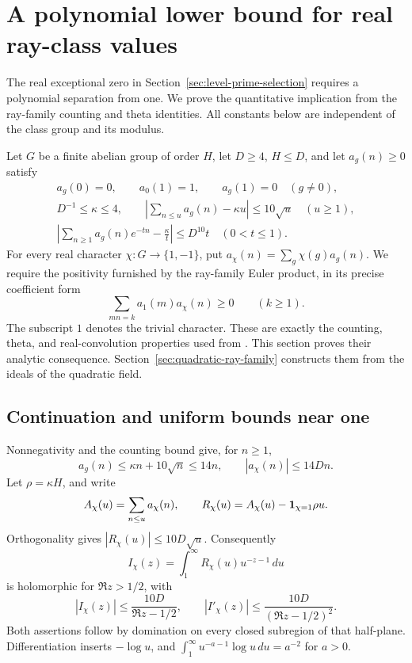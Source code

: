 \section{A polynomial lower bound for real ray-class values}
\label{sec:ray-real-gap}

The real exceptional zero in
Section~\ref{sec:level-prime-selection} requires a polynomial separation
from one. We prove the quantitative implication from the ray-family
counting and theta identities. All constants below are independent of
the class group and its modulus.

Let \(G\) be a finite abelian group of order \(H\), let \(D\geq4\),
\(H\leq D\), and let \(a_g(n)\geq0\) satisfy
\[
 \begin{gathered}
 a_g(0)=0,\qquad a_0(1)=1,\qquad a_g(1)=0\quad(g\ne0),\\
 D^{-1}\leq\kappa\leq4,\qquad
 \left|\sum_{n\leq u}a_g(n)-\kappa u\right|
                                  \leq10\sqrt u\quad(u\geq1),\\
 \left|\sum_{n\geq1}a_g(n)e^{-tn}-\frac{\kappa}{t}\right|
                                   \leq D^{10}t\quad(0<t\leq1).
 \end{gathered}
\]
For every real character \(\chi:G\to\{1,-1\}\), put
\(a_\chi(n)=\sum_g\chi(g)a_g(n)\).
We require the positivity furnished by the ray-family Euler product,
in its precise coefficient form
\begin{equation}
 \label{eq:ray-convolution-positive}
          \sum_{mn=k}a_1(m)a_\chi(n)\geq0\qquad(k\geq1).
\end{equation}
The subscript \(1\) denotes the trivial character. These are exactly
the counting, theta, and real-convolution properties used from
. This section proves their analytic consequence. Section~\ref{sec:quadratic-ray-family} constructs them from the ideals
of the quadratic field.

\subsection{Continuation and uniform bounds near one}

Nonnegativity and the counting bound give, for \(n\geq1\),
\[
       a_g(n)\leq\kappa n+10\sqrt n\leq14n,
                         \qquad |a_\chi(n)|\leq14Dn.
\]
Let \(\rho=\kappa H\), and write
\[
 A_\chi(u)=\sum_{n\leq u}a_\chi(n),\qquad
 R_\chi(u)=A_\chi(u)-{\bf1}_{\chi=1}\rho u .
\]
Orthogonality gives \(|R_\chi(u)|\leq10D\sqrt u\).
Consequently
\[
        I_\chi(z)=\int_1^\infty R_\chi(u)u^{-z-1}\,du
\]
is holomorphic for \(\Re z>1/2\), with
\[
 |I_\chi(z)|\leq\frac{10D}{\Re z-1/2},\qquad
 |I'_\chi(z)|\leq\frac{10D}{(\Re z-1/2)^2}.
\]
Both assertions follow by domination on every closed subregion of
that half-plane. Differentiation inserts \(-\log u\), and
\(\int_1^\infty u^{-a-1}\log u\,du=a^{-2}\) for \(a>0\).

